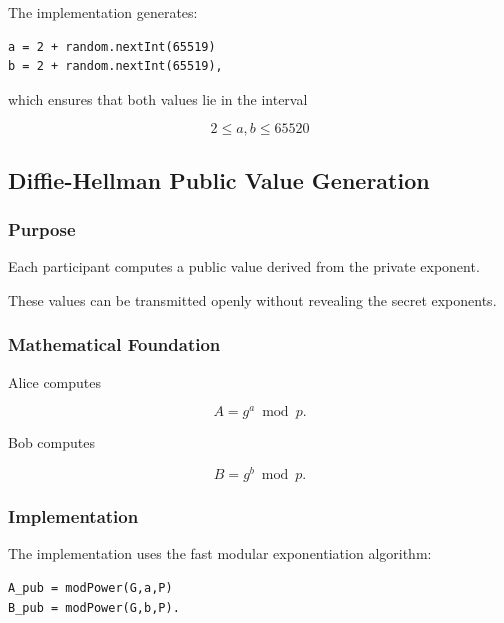 \documentclass[12pt]{article}
\begin{document}
The implementation generates:

\begin{verbatim}
a = 2 + random.nextInt(65519)
b = 2 + random.nextInt(65519),
\end{verbatim}

which ensures that both values lie in the interval

\begin{equation}
2 \le a,b \le 65520
\end{equation}


\subsection{Diffie-Hellman Public Value Generation}

\subsubsection{Purpose}

Each participant computes a public value derived from the private exponent.

These values can be transmitted openly without revealing the secret exponents.

\subsubsection{Mathematical Foundation}

Alice computes

\begin{equation}
A = g^a \bmod p.
\end{equation}

Bob computes

\begin{equation}
B = g^b \bmod p.
\end{equation}

\subsubsection{Implementation}

The implementation uses the fast modular exponentiation algorithm:

\begin{verbatim}
A_pub = modPower(G,a,P)
B_pub = modPower(G,b,P).
\end{verbatim}
\end{document}
